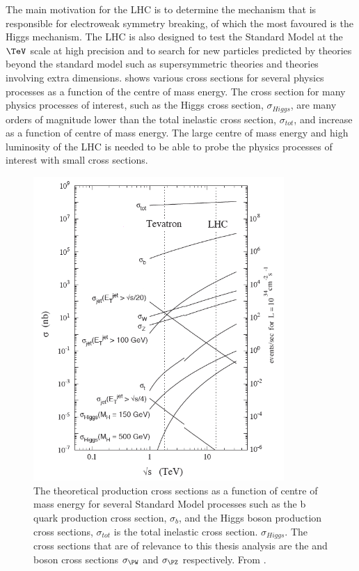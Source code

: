 The main motivation for the LHC is to determine the mechanism that is
responsible for electroweak symmetry breaking, of which the most favoured is the
Higgs mechanism.  The LHC is also designed to test the Standard Model at the
$\TeV$ scale at high precision and to search for new particles predicted by
theories beyond the standard model such as supersymmetric theories and theories
involving extra dimensions.   shows various cross
sections for several physics processes as a function of the centre of mass
energy. The cross section for many physics processes of interest, such as the
Higgs cross section, $\sigma_{Higgs}$, are many orders of magnitude lower than the
total inelastic cross section, $\sigma_{tot}$, and increase as a function of
centre of mass energy.  The large centre of mass energy and high luminosity of
the LHC is needed to be able to probe the physics processes of interest with
small cross sections.

\begin{figure}[htbp]
  \centering
  \includegraphics[width=0.85\textwidth]{xsec.png}
  \caption{The theoretical production cross sections as a function of centre of mass energy
for several Standard Model processes such as the b quark production cross
section, $\sigma_{b}$, and the Higgs boson production cross sections,
$\sigma_{tot}$ is the total inelastic cross section.
$\sigma_{Higgs}$. The cross sections that are of relevance to this thesis
analysis are the \PW and \PZ boson cross sections $\sigma_{\PW}$ and
$\sigma_{\PZ}$ respectively.
From \cite{campbell2006hard}.}
  \label{fig:LHCxsec}
\end{figure}

